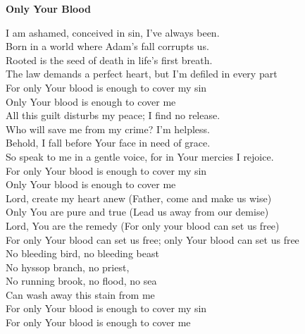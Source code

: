 \textbf{Only Your Blood}

I am ashamed, conceived in sin, I’ve always been. \\
Born in a world where Adam’s fall corrupts us. \\
Rooted is the seed of death in life’s first breath. \\
The law demands a perfect heart, but I’m defiled in every part \\

For only Your blood is enough to cover my sin \\
Only Your blood is enough to cover me \\

All this guilt disturbs my peace; I find no release. \\
Who will save me from my crime? I’m helpless. \\
Behold, I fall before Your face in need of grace. \\
So speak to me in a gentle voice, for in Your mercies I rejoice. \\

For only Your blood is enough to cover my sin \\
Only Your blood is enough to cover me \\

Lord, create my heart anew (Father, come and make us wise) \\
Only You are pure and true (Lead us away from our demise) \\
Lord, You are the remedy (For only your blood can set us free) \\

For only Your blood can set us free; only Your blood can set us free \\

No bleeding bird, no bleeding beast \\
No hyssop branch, no priest, \\
No running brook, no flood, no sea \\
Can wash away this stain from me \\

For only Your blood is enough to cover my sin \\
For only Your blood is enough to cover me \\
